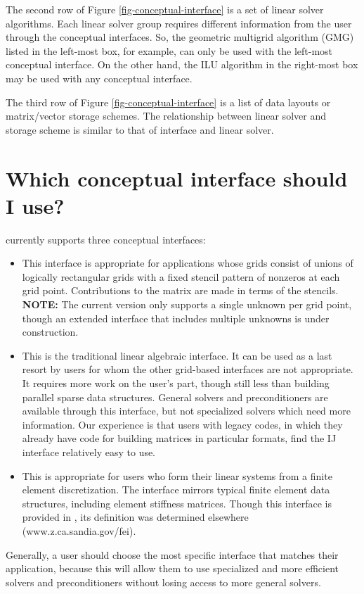 The second row of Figure \ref{fig-conceptual-interface} is a set of linear solver algorithms.
Each linear solver group requires different information from the user through
the conceptual interfaces.  So, the geometric multigrid algorithm (GMG) listed
in the left-most box, for example, can only be used with the left-most conceptual
interface.  On the other hand, the ILU algorithm in the right-most box may be
used with any conceptual interface. 

The third row of Figure \ref{fig-conceptual-interface} is a list of data layouts or matrix/vector storage
schemes.  The relationship between linear solver and storage scheme is similar
to that of interface and linear solver.


\section{Which conceptual interface should I use?}

\hypre{} currently supports three conceptual interfaces:

\begin{itemize}

\item
{}
This interface is appropriate for applications whose grids
consist of unions of logically rectangular grids with a fixed
stencil pattern of nonzeros at each grid point.
Contributions to the matrix are made in terms of the stencils.
{\bf NOTE:} The current version only supports a single unknown
per grid point, though an extended interface that includes
multiple unknowns is under construction.

\item
{}
This is the traditional linear algebraic interface. 
It can be used as a last resort by users for whom the other
grid-based interfaces are not appropriate.
It requires more work on the user's part, though still less than
building parallel sparse data structures.
General solvers and preconditioners are available through this
interface, but not specialized solvers which need more information.
Our experience is that users with legacy codes, in which they already
have code for building matrices in particular formats, find the
IJ interface relatively easy to use.

\item
{}
This is appropriate for users who form their linear systems from
a finite element discretization.
The interface mirrors typical finite element data structures,
including element stiffness matrices.
Though this interface is provided in \hypre{}, its definition
was determined elsewhere (www.z.ca.sandia.gov/fei).

\end{itemize}

Generally, a user should choose the most specific interface
that matches their application, because this will allow them
to use specialized and more efficient solvers and preconditioners
without losing access to more general solvers.